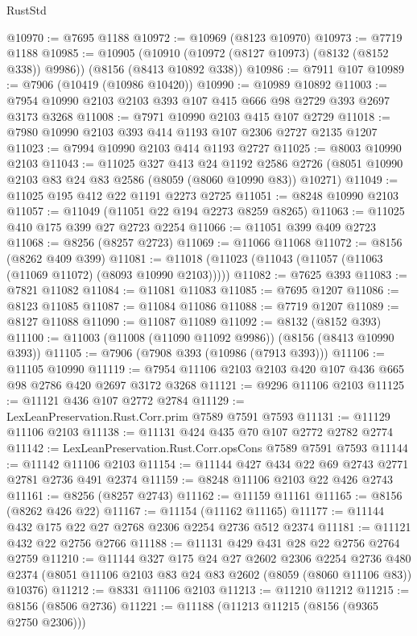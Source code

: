\begin{lexlean}{RustStd}
\begin{coremodule}
{\begin{coremodule}
{{{{{{{{{{{{{{{{{{{{{{{{{{{{{{{{{{@10970 := @7695 @1188
@10972 := @10969 (@8123 @10970)
@10973 := @7719 @1188
@10985 := @10905
    (@10910 (@10972 (@8127 @10973) (@8132 (@8152 @338)) @9986))
    (@8156 (@8413 @10892 @338))
@10986 := @7911 @107
@10989 := @7906 (@10419 (@10986 @10420))
@10990 := @10989 @10892
@11003 := @7954 @10990 @2103 @2103 @393 @107 @415 @666 @98 @2729 @393 @2697 @3173 @3268
@11008 := @7971 @10990 @2103 @415 @107 @2729
@11018 := @7980 @10990 @2103 @393 @414 @1193 @107 @2306 @2727 @2135 @1207
@11023 := @7994 @10990 @2103 @414 @1193 @2727
@11025 := @8003 @10990 @2103
@11043 := @11025
    @327
    @413
    @24
    @1192
    @2586
    @2726
    (@8051 @10990 @2103 @83 @24 @83 @2586 (@8059 (@8060 @10990 @83)) @10271)
@11049 := @11025 @195 @412 @22 @1191 @2273 @2725
@11051 := @8248 @10990 @2103
@11057 := @11049 (@11051 @22 @194 @2273 @8259 @8265)
@11063 := @11025 @410 @175 @399 @27 @2723 @2254
@11066 := @11051 @399 @409 @2723
@11068 := @8256 (@8257 @2723)
@11069 := @11066 @11068
@11072 := @8156 (@8262 @409 @399)
@11081 := @11018 (@11023 (@11043 (@11057 (@11063 (@11069 @11072) (@8093 @10990 @2103)))))
@11082 := @7625 @393
@11083 := @7821 @11082
@11084 := @11081 @11083
@11085 := @7695 @1207
@11086 := @8123 @11085
@11087 := @11084 @11086
@11088 := @7719 @1207
@11089 := @8127 @11088
@11090 := @11087 @11089
@11092 := @8132 (@8152 @393)
@11100 := @11003 (@11008 (@11090 @11092 @9986)) (@8156 (@8413 @10990 @393))
@11105 := @7906 (@7908 @393 (@10986 (@7913 @393)))
@11106 := @11105 @10990
@11119 := @7954 @11106 @2103 @2103 @420 @107 @436 @665 @98 @2786 @420 @2697 @3172 @3268
@11121 := @9296 @11106 @2103
@11125 := @11121 @436 @107 @2772 @2784
@11129 := LexLeanPreservation.Rust.Corr.prim @7589 @7591 @7593
@11131 := @11129 @11106 @2103
@11138 := @11131 @424 @435 @70 @107 @2772 @2782 @2774
@11142 := LexLeanPreservation.Rust.Corr.opsCons @7589 @7591 @7593
@11144 := @11142 @11106 @2103
@11154 := @11144 @427 @434 @22 @69 @2743 @2771 @2781 @2736 @491 @2374
@11159 := @8248 @11106 @2103 @22 @426 @2743
@11161 := @8256 (@8257 @2743)
@11162 := @11159 @11161
@11165 := @8156 (@8262 @426 @22)
@11167 := @11154 (@11162 @11165)
@11177 := @11144 @432 @175 @22 @27 @2768 @2306 @2254 @2736 @512 @2374
@11181 := @11121 @432 @22 @2756 @2766
@11188 := @11131 @429 @431 @28 @22 @2756 @2764 @2759
@11210 := @11144
    @327
    @175
    @24
    @27
    @2602
    @2306
    @2254
    @2736
    @480
    @2374
    (@8051 @11106 @2103 @83 @24 @83 @2602 (@8059 (@8060 @11106 @83)) @10376)
@11212 := @8331 @11106 @2103
@11213 := @11210 @11212
@11215 := @8156 (@8506 @2736)
@11221 := @11188 (@11213 @11215 (@8156 (@9365 @2750 @2306)))
}}}}}}}}}}}}}}}}}}}}}}}}}}}}}}}}}}
\end{coremodule}}
\end{coremodule}
\end{lexlean}
